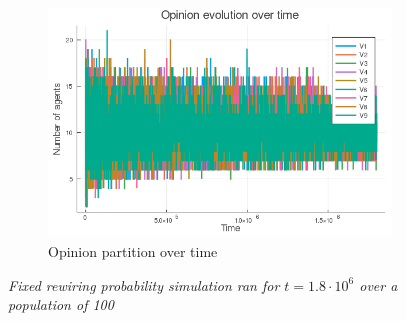 \documentclass[12pt,openright,twoside]{book}
\begin{document}
\begin{appendices}
\begin{figure}[!htb]
\begin{subfigure}[b]{0.65\linewidth}
    \includegraphics[width=\linewidth]{figures/2_2/vote_evolution.png}
    \caption{Opinion partition over time}
\end{subfigure}
\caption{\textit{{\small Fixed rewiring probability simulation ran for $t=1.8\cdot 10^6$ over a population of 100}}}
\label{2_2}
\end{figure}


\end{appendices}
\end{document}
